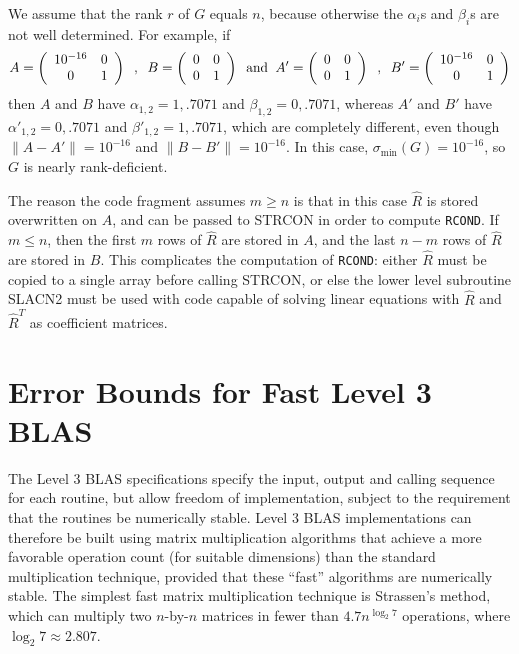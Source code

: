 We assume that the rank $r$ of $G$ equals $n$, because otherwise the
$\alpha_i$s and $\beta_i$s are not well determined. For example, if
\[
A = \bmat{cc} 10^{-16} & 0 \\ 0 & 1 \emat
\; \; , \; \;
B = \bmat{cc} 0 & 0 \\ 0 & 1 \emat
\; \; {\rm and} \; \;
A' = \bmat{cc} 0 & 0 \\ 0 & 1 \emat
\; \; , \; \;
B' = \bmat{cc} 10^{-16} & 0 \\ 0 & 1 \emat
\]
then $A$ and $B$ have
$\alpha_{1,2} = 1, .7071$ and $\beta_{1,2} = 0, .7071$, whereas
$A'$ and $B'$ have
$\alpha'_{1,2} = 0, .7071$ and $\beta'_{1,2} = 1, .7071$, which
are completely different, even though $\|A - A' \| = 10^{-16}$ and
$\|B - B' \| = 10^{-16}$. In this case, $\sigma_{\min} (G) = 10^{-16}$,
so $G$ is nearly rank-deficient.

The reason the code fragment assumes $m \geq n$ is that in this case $\hat{R}$ is
stored overwritten on $A$, and can be passed to STRCON in order to compute
{\tt RCOND}. If $m \leq n$, then the
first $m$ rows of $\hat{R}$ are
stored in $A$, and the last $n-m$ rows of $\hat{R}$ are stored in $B$. This
complicates the computation of {\tt RCOND}: either $\hat{R}$ must be copied to
a single array before calling STRCON, or else the lower level subroutine SLACN2
must be used with code capable of solving linear equations with $\hat{R}$
and $\hat{R}^T$ as coefficient matrices.

\section{Error Bounds for Fast Level 3 BLAS}\label{secfastblas}

\def\Xhat{\widehat X}
\def\Chat{\widehat C}
\def\normo#1{\|#1\|_{\infty}}
\def\u{\epsilon}

The Level 3 BLAS specifications \cite{blas3} specify the input, output
and calling sequence for each routine, but allow freedom of
implementation, subject to the requirement that the routines be
numerically stable.
Level 3 BLAS implementations can therefore be
built using matrix multiplication algorithms that achieve a more
favorable operation count (for suitable dimensions) than the standard
multiplication technique, provided that these ``fast''  algorithms are
numerically stable.  The simplest fast matrix multiplication
technique is Strassen's
method, which can
multiply two $n$-by-$n$
matrices in fewer than $4.7 n^{\log_2 7}$ operations, where
$\log_2 7 \approx 2.807$.

